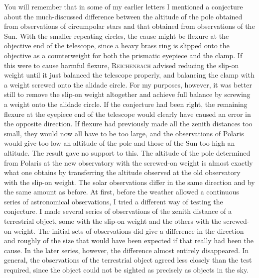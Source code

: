 \par\indent You will remember that in some of my earlier letters I mentioned a conjecture about the much-discussed difference between the altitude of the pole obtained from observations of circumpolar stars and that obtained from observations of the Sun. With the smaller repeating circles, the cause might be flexure at the objective end of the telescope, since a heavy brass ring is slipped onto the objective as a counterweight for both the prismatic eyepiece and the clamp. If this were to cause harmful flexure, \textsc{Reichenbach} advised reducing the slip-on weight until it just balanced the telescope properly, and balancing the clamp with a weight screwed onto the alidade circle. For my purposes, however, it was better still to remove the slip-on weight altogether and achieve full balance by screwing a weight onto the alidade circle. If the conjecture had been right, the remaining flexure at the eyepiece end of the telescope would clearly have caused an error in the opposite direction. If flexure had previously made all the zenith distances too small, they would now all have to be too large, and the observations of Polaris would give too low an altitude of the pole and those of the Sun too high an altitude. The result gave no support to this. The altitude of the pole determined from Polaris at the new observatory with the screwed-on weight is almost exactly what one obtains by transferring the altitude observed at the old observatory with the slip-on weight. The solar observations differ in the same direction and by the same amount as before. At first, before the weather allowed a continuous series of astronomical observations, I tried a different way of testing the conjecture. I made several series of observations of the zenith distance of a terrestrial object, some with the slip-on weight and the others with the screwed-on weight. The initial sets of observations did give a difference in the direction and roughly of the size that would have been expected if that really had been the cause. In the later series, however, the difference almost entirely disappeared. In general, the observations of the terrestrial object agreed less closely than the test required, since the object could not be sighted as precisely as objects in the sky.

